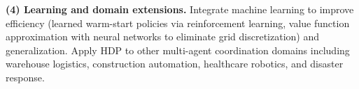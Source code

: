 \documentclass[manuscript,screen,review]{acmart}
\begin{document}
\textbf{(4) Learning and domain extensions.} Integrate machine learning to 
improve efficiency (learned warm-start policies via reinforcement learning, 
value function approximation with neural networks to eliminate grid discretization) 
and generalization. Apply HDP to other multi-agent coordination domains including 
warehouse logistics, construction automation, healthcare robotics, and disaster 
response.





\appendix
\end{document}
